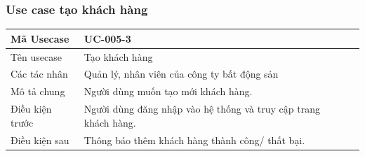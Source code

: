 \documentclass[12pt,a4paper]{article}
\begin{document}
    \subsubsection*{Use case tạo khách hàng}
    \begin{table}[H]
        \centering
        \begin{tabular}{|p{3.5cm}|p{11.5cm}|c|}
            \hline
            Mã Usecase      & UC-005-3                                                        \\
            \hline
            Tên usecase     & Tạo khách hàng                                                  \\
            \hline
            Các tác nhân    & Quản lý, nhân viên của công ty bất động sản                     \\
            \hline
            Mô tả chung     & Người dùng muốn tạo mới khách hàng.                             \\
            \hline

            Điều kiện trước & Người dùng đăng nhập vào hệ thống và truy cập trang khách hàng. \\
            \hline

            Điều kiện sau   & Thông báo thêm khách hàng thành công/ thất bại.                 \\
            \hline


\end{tabular}
\end{table}
\end{document}
